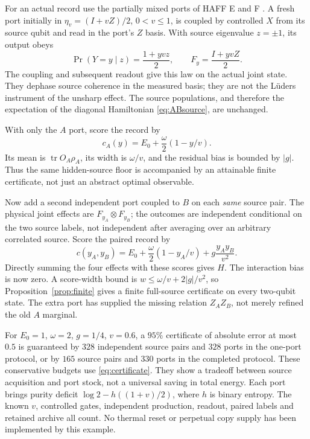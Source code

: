 \documentclass[12pt,a4paper]{article}
\theoremstyle{definition}
\newcommand{\tr}{\operatorname{tr}}
\begin{document}
For an actual record use the partially mixed ports of HAFF E and F
\cite{Liu2026PaperE,Liu2026PaperF}. A fresh port initially in
$\eta_v=(I+vZ)/2$, $0<v\leq1$, is coupled by controlled $X$ from its
source qubit and read in the port's $Z$ basis. With source eigenvalue
$z=\pm1$, its output obeys
\begin{equation}
 \Pr(Y=y\mid z)=\frac{1+yvz}{2},\qquad
 F_y=\frac{I+yvZ}{2}.
 \label{eq:port}
\end{equation}
The coupling and subsequent readout give this law on the actual joint
state. They dephase source coherence in the measured basis; they are not
the L\"uders instrument of the unsharp effect. The source populations,
and therefore the expectation of the diagonal Hamiltonian
\eqref{eq:ABsource}, are unchanged.

With only the $A$ port, score the record by
\begin{equation}
 c_A(y)=E_0+\frac\omega2(1-y/v).
\end{equation}
Its mean is $\tr O_A\rho_A$, its width is $\omega/v$, and the residual
bias is bounded by $|g|$. Thus the same hidden-source floor is accompanied
by an attainable finite certificate, not just an abstract optimal
observable.

Now add a second independent port coupled to $B$ on each \emph{same}
source pair. The physical joint effects are $F_{y_A}\otimes F_{y_B}$;
the outcomes are independent conditional on the two source labels, not
independent after averaging over an arbitrary correlated source. Score
the paired record by
\begin{equation}
 c(y_A,y_B)=E_0+\frac\omega2(1-y_A/v)+g\frac{y_Ay_B}{v^2}.
 \label{eq:fullscore}
\end{equation}
Directly summing the four effects with these scores gives $H$. The
interaction bias is now zero. A score-width bound is
$w\leq\omega/v+2|g|/v^2$, so Proposition~\ref{prop:finite} gives a
finite full-source certificate on every two-qubit state. The extra port
has supplied the missing relation $Z_AZ_B$, not merely refined the old
$A$ marginal.

For $E_0=1$, $\omega=2$, $g=1/4$, $v=0.6$, a $95\%$ certificate of
absolute error at most $0.5$ is guaranteed by $328$ independent source
pairs and $328$ ports in the one-port protocol, or by $165$ source pairs
and $330$ ports in the completed protocol. These conservative budgets
use \eqref{eq:certificate}. They show a tradeoff between source acquisition
and port stock, not a universal saving in total energy. Each port brings
purity deficit $\log2-h((1+v)/2)$, where $h$ is binary entropy. The
known $v$, controlled gates, independent production, readout, paired
labels and retained archive all count. No thermal reset or perpetual
copy supply has been implemented by this example.
\end{document}
